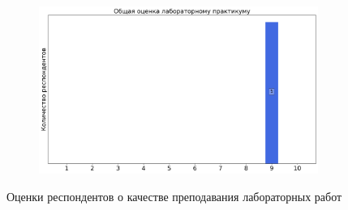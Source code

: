 \begin{figure}[H]
\begin{subfigure}[b]{0.45\textwidth}
			\end{subfigure}
			\begin{subfigure}[b]{0.45\textwidth}
				\centering
				\includegraphics[width=\textwidth]{images/3 course/Радиофизическая лаборатория/labniks-marks-Тимофеенко-3.png}
			\end{subfigure}	
			\caption{Оценки респондентов о качестве преподавания лабораторных работ}
		\end{figure}


